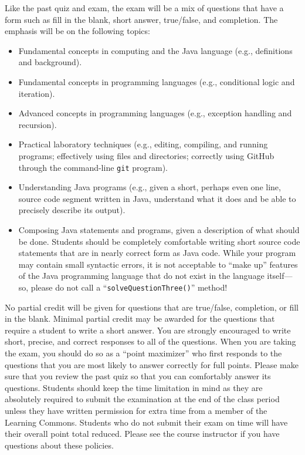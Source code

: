 \documentclass[11pt]{article}
\begin{document}
  \noindent Like the past quiz and exam, the exam will be a mix of questions that have a form such as fill in the blank,
short answer, true/false, and completion. The emphasis will be on the following topics:

\vspace*{-.05in}
\begin{itemize}

  \itemsep 0in

  \item Fundamental concepts in computing and the Java language (e.g., definitions and background).

  \item Fundamental concepts in programming languages (e.g., conditional logic and iteration).

  \item Advanced concepts in programming languages (e.g., exception handling and recursion).

  \item Practical laboratory techniques (e.g., editing, compiling, and running programs; effectively using files and
    directories; correctly using GitHub through the command-line {\tt git} program).

  \item Understanding Java programs (e.g., given a short, perhaps even one line, source code segment written in Java,
    understand what it does and be able to precisely describe its output).

  \item Composing Java statements and programs, given a description of what should be done. Students should be completely
    comfortable writing short source code statements that are in nearly correct form as Java code. While your program may
    contain small syntactic errors, it is not acceptable to ``make up'' features of the Java programming language that do
    not exist in the language itself---so, please do not call a ``{\tt solveQuestionThree()}'' method!

\end{itemize}

\noindent No partial credit will be given for questions that are true/false, completion, or fill in the blank. Minimal
partial credit may be awarded for the questions that require a student to write a short answer. You are strongly
encouraged to write short, precise, and correct responses to all of the questions. When you are taking the exam, you
should do so as a ``point maximizer'' who first responds to the questions that you are most likely to answer correctly
for full points. Please make sure that you review the past quiz so that you can comfortably answer its questions.
Students should keep the time limitation in mind as they are absolutely required to submit the examination at the end of
the class period unless they have written permission for extra time from a member of the Learning Commons. Students who
do not submit their exam on time will have their overall point total reduced. Please see the course instructor if you
have questions about these policies.
\end{document}
